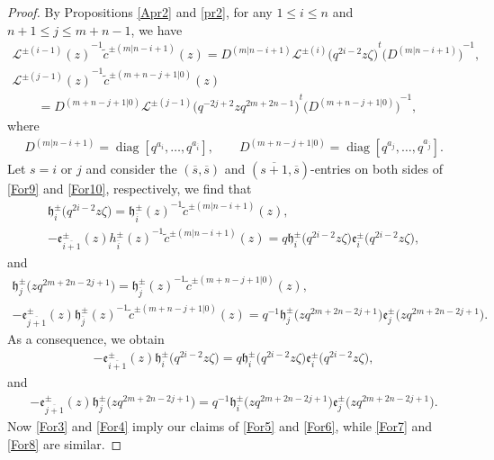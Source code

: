 \documentclass[10pt,a4paper]{amsart}
\numberwithin{equation}{section}
\begin{document}
\begin{proof}
By Propositions \ref{Apr2} and \ref{pr2}, for any $1\leq i\leq n$ and $n+1\leq j\leq m+n-1$, we have
\begin{gather}\label{For9}
 {\mathcal{L}^{\pm (i-1)}(z)}^{-1}\widetilde{c}^{\pm (m|n-i+1)}(z)=D^{(m|n-i+1)}{\mathcal{L}^{\pm(i)}\bigl(q^{2i-2}z\zeta\bigr)}^{t}{\bigl(D^{(m|n-i+1)}\bigr)}^{-1},\\
 \label{For10}
 {\mathcal{L}^{\pm (j-1)}(z)}^{-1}\widetilde{c}^{\pm (m+n-j+1|0)}(z)\nonumber\\
 \qquad=D^{(m+n-j+1|0)}{\mathcal{L}^{\pm(j-1)}\bigl(q^{-2j+2}zq^{2m+2n-1}\bigr)}^{t}{\bigl(D^{(m+n-j+1|0)}\bigr)}^{-1},
\end{gather}
where
\begin{gather*}
 D^{(m|n-i+1)}=\operatorname{diag}[q^{a_{i}},\dots,q^{a_{\overline{i}}}],\qquad
 D^{(m+n-j+1|0)}=\operatorname{diag}[q^{a_{j}},\dots,q^{a_{\overline{j}}}].
\end{gather*}Let $s=i$ or $j$ and consider the $(\overline{s},\overline{s})$ and $(\overline{s+1},\overline{s})$-entries on both sides of \eqref{For9} and \eqref{For10}, respectively, we find that
\begin{gather*}
 \mathfrak{h}_i^{\pm}\bigl(q^{2i-2}z\zeta\bigr)={\mathfrak{h}_{\overline{i}}^{\pm}(z)}^{-1}\widetilde{c}^{\pm(m|n-i+1)}(z),\\
 -\mathfrak{e}_{\overline{i+1}}^{\pm}(z){h_{\overline{i}}^{\pm}(z)}^{-1}\widetilde{c}^{\pm(m|n-i+1)}(z)
 =q\mathfrak{h}_i^{\pm}\bigl(q^{2i-2}z\zeta\bigr)\mathfrak{e}_i^{\pm}\bigl(q^{2i-2}z\zeta\bigr),
\end{gather*}
and
\begin{gather*}
 \mathfrak{h}_{j}^{\pm}\bigl(zq^{2m+2n-2j+1}\bigr)={\mathfrak{h}_{\overline{j}}^{\pm}(z)}^{-1}\widetilde{c}^{\pm(m+n-j+1|0)}(z),\\
 -\mathfrak{e}_{\overline{j+1}}^{\pm}(z){\mathfrak{h}_{\overline{j}}^{\pm}(z)}^{-1}\widetilde{c}^{\pm(m+n-j+1|0)}(z)
 =q^{-1}\mathfrak{h}_{j}^{\pm}\bigl(zq^{2m+2n-2j+1}\bigr)\mathfrak{e}_{j}^{\pm}\bigl(zq^{2m+2n-2j+1}\bigr).
\end{gather*}
As a consequence, we obtain
 \begin{gather*}
 -\mathfrak{e}_{\overline{i+1}}^{\pm}(z)\mathfrak{h}_i^{\pm}\bigl(q^{2i-2}z\zeta\bigr)
 =q\mathfrak{h}_i^{\pm}\bigl(q^{2i-2}z\zeta\bigr)\mathfrak{e}_i^{\pm}\bigl(q^{2i-2}z\zeta\bigr),
\end{gather*}and
 \begin{gather*}
 -\mathfrak{e}_{\overline{j+1}}^{\pm}(z)\mathfrak{h}_{j}^{\pm}\bigl(zq^{2m+2n-2j+1}\bigr)
 =q^{-1}\mathfrak{h}_i^{\pm}\bigl(zq^{2m+2n-2j+1}\bigr)\mathfrak{e}_{j}^{\pm}\bigl(zq^{2m+2n-2j+1}\bigr).
\end{gather*}
Now \eqref{For3} and \eqref{For4} imply our claims of \eqref{For5} and \eqref{For6}, while \eqref{For7} and \eqref{For8} are similar.
\end{proof}
\end{document}
